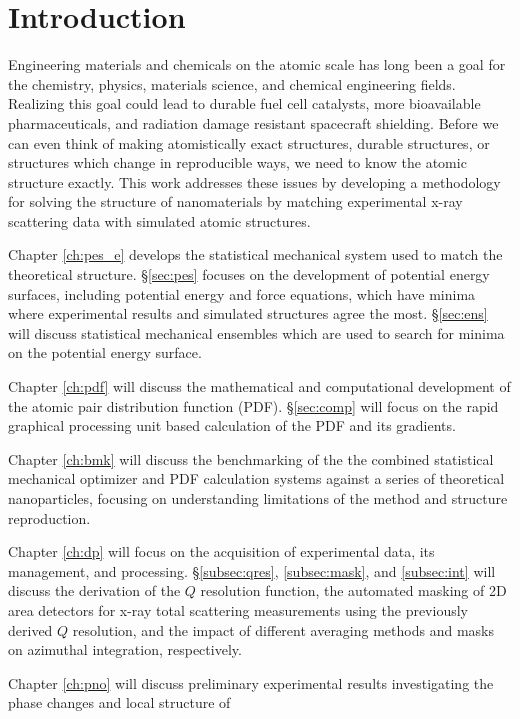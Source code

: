 \chapter*{Introduction} \label{intro}
Engineering materials and chemicals on the atomic scale has long been a goal for the chemistry, physics, materials science, and chemical engineering fields.
Realizing this goal could lead to durable fuel cell catalysts, more bioavailable pharmaceuticals, and radiation damage resistant spacecraft shielding.
Before we can even think of making atomistically exact structures, durable structures, or structures which change in reproducible ways, we need to know the atomic structure exactly.
This work addresses these issues by developing a methodology for solving the structure of nanomaterials by matching experimental x-ray scattering data with simulated atomic structures.

Chapter \ref{ch:pes_e} develops the statistical mechanical system used to match the theoretical structure.
\S \ref{sec:pes} focuses on the development of potential energy surfaces, including potential energy and force equations, which have minima where experimental results and simulated structures agree the most.
\S \ref{sec:ens} will discuss statistical mechanical ensembles which are used to search for minima on the potential energy surface.

Chapter \ref{ch:pdf} will discuss the mathematical and computational development of the atomic pair distribution function (PDF).
\S \ref{sec:comp} will focus on the rapid graphical processing unit based calculation of the PDF and its gradients.

Chapter \ref{ch:bmk} will discuss the benchmarking of the the combined statistical mechanical optimizer and PDF calculation systems against a series of theoretical nanoparticles, focusing on understanding limitations of the method and structure reproduction.

Chapter \ref{ch:dp} will focus on the acquisition of experimental data, its management, and processing.
\S \ref{subsec:qres}, \ref{subsec:mask}, and \ref{subsec:int} will discuss the derivation of the $Q$ resolution function, the automated masking of 2D area detectors for x-ray total scattering measurements using the previously derived $Q$ resolution, and the impact of different averaging methods and masks on azimuthal integration, respectively.

Chapter \ref{ch:pno} will discuss preliminary experimental results investigating the phase changes and local structure of 